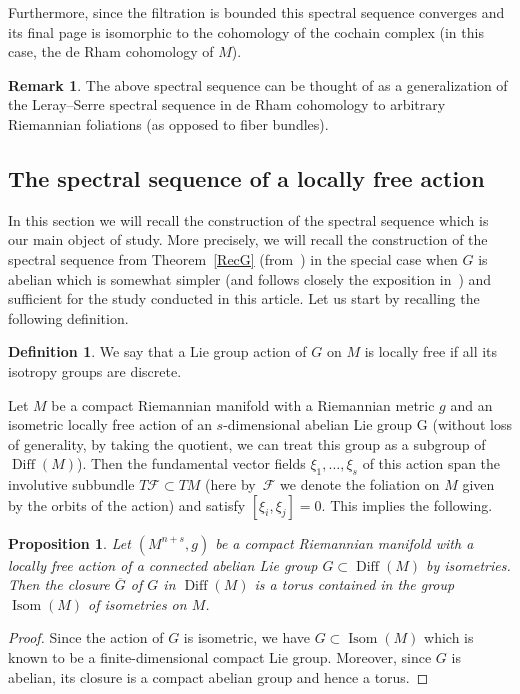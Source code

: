 \documentclass[pdftex]{sigma}
\numberwithin{equation}{section}
\newtheorem{prop}[tw]{Proposition}
\theoremstyle{definition}
\newtheorem{defi}[tw]{Definition}
\newtheorem{rem}[tw]{Remark}
\begin{document}
Furthermore, since the filtration is bounded this spectral sequence converges and its final page is isomorphic to the cohomology of the cochain complex (in this case, the de Rham cohomology of $M$).
\begin{rem} The above spectral sequence can be thought of as a generalization of the Leray--Serre spectral sequence in de Rham cohomology to arbitrary Riemannian foliations (as opposed to fiber bundles).
\end{rem}

\subsection{The spectral sequence of a locally free action}
In this section we will recall the construction of the spectral sequence which is our main object of study. More precisely, we will recall the construction of the spectral sequence from Theorem~\ref{RecG} (from~\cite{My4}) in the special case when $G$ is abelian which is somewhat simpler (and follows closely the exposition in~\cite{My3}) and sufficient for the study conducted in this article. Let us start by recalling the following definition.

\begin{defi} We say that a Lie group action of $G$ on $M$ is locally free if all its isotropy groups are discrete.
\end{defi}

Let $M$ be a compact Riemannian manifold with a Riemannian metric $g$ and an isometric locally free action of an $s$-dimensional abelian Lie group G (without loss of generality, by taking the quotient, we can treat this group as a subgroup of $\operatorname{Diff}(M)$). Then the fundamental vector fields $\xi_1,\dots,\xi_s$ of this action span the involutive subbundle $T\mathcal{F}\subset TM$ (here by~$\mathcal{F}$ we denote the foliation on $M$ given by the orbits of the action) and satisfy $[\xi_i,\xi_j]=0$. This implies the following.

\begin{prop} Let $(M^{n+s},g)$ be a compact Riemannian manifold with a locally free action of a connected abelian Lie group $G\subset \operatorname{Diff}(M)$ by isometries. Then the closure $\overline{G}$ of $G$ in $\operatorname{Diff}(M)$ is a torus contained in the group $\operatorname{Isom}(M)$ of isometries on $M$.
\end{prop}

\begin{proof} Since the action of $G$ is isometric, we have $G\subset \operatorname{Isom}(M)$ which is known to be a finite-dimensional compact Lie group. Moreover, since $G$ is abelian, its closure is a compact abelian group and hence a torus.
\end{proof}
\end{document}
